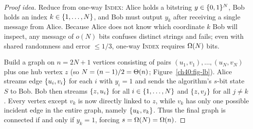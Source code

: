 \begin{proof}[Proof idea]
Reduce from one-way \textsc{Index}: Alice holds a bitstring $y\in\{0,1\}^N$,
Bob holds an index $k\in\{1,\dots,N\}$, and Bob must output $y_k$ after
receiving a single message from Alice. Because Alice does not know which
coordinate $k$ Bob will inspect, any message of $o(N)$ bits confuses distinct
strings and fails; even with shared randomness and error $\le 1/3$, one-way
\textsc{Index} requires $\Omega(N)$ bits.

Build a graph on $n = 2N+1$ vertices consisting of pairs $(u_1,v_1),\dots,(u_N,v_N)$
plus one hub vertex $z$ (so $N=(n-1)/2=\Theta(n)$; Figure~\ref{ch40:fig-lb}). Alice
streams edge $\{u_i,v_i\}$ for each $i$ with $y_i=1$ and sends the algorithm's
$s$-bit state $S$ to Bob. Bob then streams $\{z,u_i\}$ for all
$i\in\{1,\dots,N\}$ and $\{z,v_j\}$ for all $j\neq k$. Every vertex except
$v_k$ is now directly linked to $z$, while $v_k$ has only one possible incident
edge in the entire graph, namely $\{u_k,v_k\}$. Thus the final graph is
connected if and only if $y_k=1$, forcing $s = \Omega(N) = \Omega(n)$.
\end{proof}

